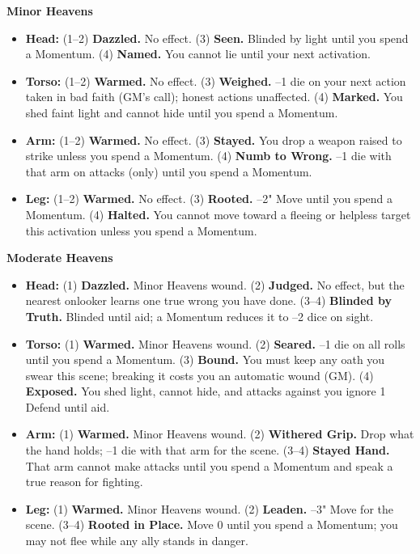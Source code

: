 \textbf{Minor Heavens}
\begin{itemize}
    \item \textbf{Head:} (1--2) \textbf{Dazzled.} No effect. (3) \textbf{Seen.} Blinded by light until you spend a Momentum. (4) \textbf{Named.} You cannot lie until your next activation.
    \item \textbf{Torso:} (1--2) \textbf{Warmed.} No effect. (3) \textbf{Weighed.} --1 die on your next action taken in bad faith (GM's call); honest actions unaffected. (4) \textbf{Marked.} You shed faint light and cannot hide until you spend a Momentum.
    \item \textbf{Arm:} (1--2) \textbf{Warmed.} No effect. (3) \textbf{Stayed.} You drop a weapon raised to strike unless you spend a Momentum. (4) \textbf{Numb to Wrong.} --1 die with that arm on attacks (only) until you spend a Momentum.
    \item \textbf{Leg:} (1--2) \textbf{Warmed.} No effect. (3) \textbf{Rooted.} --2" Move until you spend a Momentum. (4) \textbf{Halted.} You cannot move toward a fleeing or helpless target this activation unless you spend a Momentum.
\end{itemize}

\textbf{Moderate Heavens}
\begin{itemize}
    \item \textbf{Head:} (1) \textbf{Dazzled.} Minor Heavens wound. (2) \textbf{Judged.} No effect, but the nearest onlooker learns one true wrong you have done. (3--4) \textbf{Blinded by Truth.} Blinded until aid; a Momentum reduces it to --2 dice on sight.
    \item \textbf{Torso:} (1) \textbf{Warmed.} Minor Heavens wound. (2) \textbf{Seared.} --1 die on all rolls until you spend a Momentum. (3) \textbf{Bound.} You must keep any oath you swear this scene; breaking it costs you an automatic wound (GM). (4) \textbf{Exposed.} You shed light, cannot hide, and attacks against you ignore 1 Defend until aid.
    \item \textbf{Arm:} (1) \textbf{Warmed.} Minor Heavens wound. (2) \textbf{Withered Grip.} Drop what the hand holds; --1 die with that arm for the scene. (3--4) \textbf{Stayed Hand.} That arm cannot make attacks until you spend a Momentum and speak a true reason for fighting.
    \item \textbf{Leg:} (1) \textbf{Warmed.} Minor Heavens wound. (2) \textbf{Leaden.} --3" Move for the scene. (3--4) \textbf{Rooted in Place.} Move 0 until you spend a Momentum; you may not flee while any ally stands in danger.
\end{itemize}


